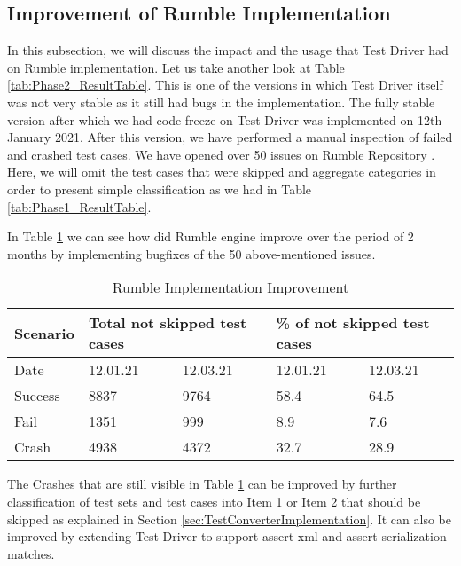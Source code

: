 \subsection{Improvement of Rumble Implementation}
In this subsection, we will discuss the impact and the usage that Test Driver had on Rumble implementation. Let us take another look at Table \ref{tab:Phase2_ResultTable}. This is one of the versions in which Test Driver itself was not very stable as it still had bugs in the implementation. The fully stable version after which we had code freeze on Test Driver was implemented on 12th January 2021. After this version, we have performed a manual inspection of failed and crashed test cases. We have opened over 50 issues on Rumble Repository \cite{RumbleRepository}. Here, we will omit the test cases that were skipped and aggregate categories in order to present simple classification as we had in Table \ref{tab:Phase1_ResultTable}.

In Table \ref{tab:bugsimprovement} we can see how did Rumble engine improve over the period of 2 months by implementing bugfixes of the 50 above-mentioned issues.
 
\begin{table}[h!]
	\centering
	\begin{tabular}{|l|l|l|l|l|}
		\hline
		Scenario & \multicolumn{2}{l|}{Total not skipped test cases} & \multicolumn{2}{l|}{\% of not skipped test cases} \\ \hline
		Date     & 12.01.21                & 12.03.21                & 12.01.21                & 12.03.21                \\ \hline
		Success  & 8837                    & 9764                    & 58.4                    & 64.5                    \\ \hline
		Fail     & 1351                    & 999                     & 8.9                     & 7.6                     \\ \hline
		Crash    & 4938                    & 4372                    & 32.7                    & 28.9                    \\ \hline
	\end{tabular}
	\caption{Rumble Implementation Improvement}
	\label{tab:bugsimprovement}
\end{table}

The Crashes that are still visible in Table \ref{tab:bugsimprovement} can be improved by further classification of test sets and test cases into Item 1 or Item 2 that should be skipped as explained in Section \ref{sec:TestConverterImplementation}. It can also be improved by extending Test Driver to support assert-xml and assert-serialization-matches.

